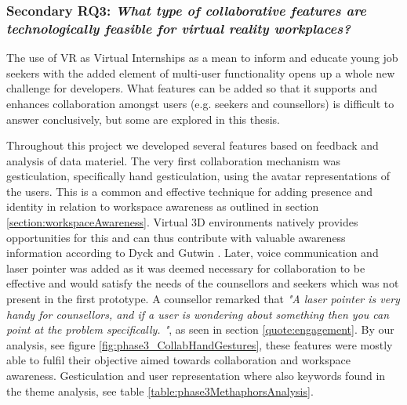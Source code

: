 




\subsubsection{Secondary RQ3: \textit{What type of collaborative features are technologically feasible for virtual reality workplaces?}} 
\label{discussion:RQ3}

The use of VR as Virtual Internships as a mean to inform and educate young job seekers with the added element of multi-user functionality opens up a whole new challenge for developers. What features can be added so that it supports and enhances collaboration amongst users (e.g. seekers and counsellors) is difficult to answer conclusively, but some are explored in this thesis.

Throughout this project we developed several features based on feedback and analysis of data materiel. The very first collaboration mechanism was gesticulation, specifically hand gesticulation, using the avatar representations of the users. This is a common and effective technique for adding presence and identity in relation to workspace awareness as outlined in section \ref{section:workspaceAwareness}. Virtual 3D environments natively provides opportunities for this and can thus contribute with valuable awareness information according to Dyck
and Gutwin \cite{dyck2002groupspace}. Later, voice communication and laser pointer was added as it was deemed necessary for collaboration to be effective and would satisfy the needs of the counsellors and seekers which was not present in the first prototype. A counsellor remarked that \textit{"A laser pointer is very handy for counsellors, and if a user is wondering about something then you can point at the problem specifically. "}, as seen in section \ref{quote:engagement}. By our analysis, see figure \ref{fig:phase3_CollabHandGestures}, these features were mostly able to fulfil their objective aimed towards collaboration and workspace awareness. Gesticulation and user representation where also keywords found in the theme analysis, see table \ref{table:phase3MethaphorsAnalysis}.


